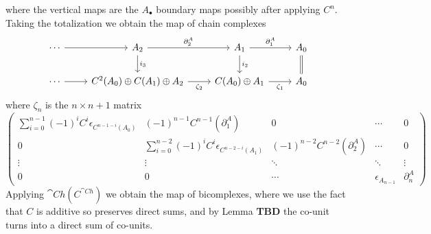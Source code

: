 where the vertical maps are the $A_\bullet$ boundary maps possibly after applying $C^n$. Taking the totalization we obtain the map of chain complexes
\[\begin{tikzcd}
	\cdots & {A_2} & {A_1} & {A_0} \\
	\cdots & {C^2(A_0)\oplus C(A_1)\oplus A_2} & {C(A_0)\oplus A_1} & {A_0}
	\arrow["{\partial_2^A}", from=1-2, to=1-3]
	\arrow[from=1-1, to=1-2]
	\arrow["{\partial_1^A}", from=1-3, to=1-4]
	\arrow[Rightarrow, no head, from=1-4, to=2-4]
	\arrow["{i_2}", from=1-3, to=2-3]
	\arrow["{i_3}", from=1-2, to=2-2]
	\arrow[from=2-1, to=2-2]
	\arrow["{\zeta_2}"', from=2-2, to=2-3]
	\arrow["{\zeta_1}"', from=2-3, to=2-4]
\end{tikzcd}\]
where $\zeta_n$ is the $n\times n+1$ matrix 
\begin{equation*}
    \begin{pmatrix}
        \sum_{i=0}^{n-1}(-1)^iC^i\epsilon_{C^{n-1-i}(A_0)} & (-1)^{n-1}C^{n-1}(\partial_1^A) & 0 & \cdots & 0 \\
        0 & \sum_{i=0}^{n-2}(-1)^iC^i\epsilon_{C^{n-2-i}(A_1)} & (-1)^{n-2}C^{n-2}(\partial_2^A) & \cdots & 0 \\
        \vdots & \vdots & \ddots & \ddots & \vdots \\
        0 & 0 & \cdots & \epsilon_{A_{n-1}} & \partial_{n}^A
    \end{pmatrix}
\end{equation*}
Applying $\cat{Ch}(C^{\cat{Ch}})$ we obtain the map of bicomplexes, where we use the fact that $C$ is additive so preserves direct sums, and by Lemma \textbf{TBD} the co-unit turns into a direct sum of co-units.
